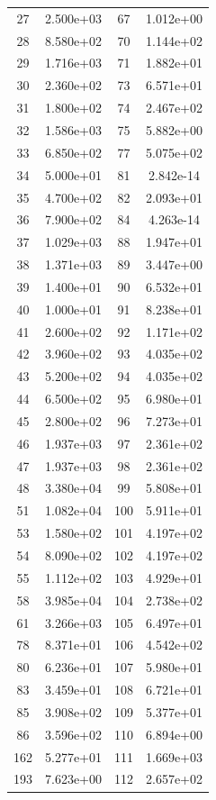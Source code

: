 \documentclass[12pt]{article}
\begin{document}
\begin{longtable}{@{}cccc@{}}
27 & 2.500e+03 & 67 & 1.012e+00 \\
28 & 8.580e+02 & 70 & 1.144e+02 \\
29 & 1.716e+03 & 71 & 1.882e+01 \\
30 & 2.360e+02 & 73 & 6.571e+01 \\
31 & 1.800e+02 & 74 & 2.467e+02 \\
32 & 1.586e+03 & 75 & 5.882e+00 \\
33 & 6.850e+02 & 77 & 5.075e+02 \\
34 & 5.000e+01 & 81 & 2.842e-14 \\
35 & 4.700e+02 & 82 & 2.093e+01 \\
36 & 7.900e+02 & 84 & 4.263e-14 \\
37 & 1.029e+03 & 88 & 1.947e+01 \\
38 & 1.371e+03 & 89 & 3.447e+00 \\
39 & 1.400e+01 & 90 & 6.532e+01 \\
40 & 1.000e+01 & 91 & 8.238e+01 \\
41 & 2.600e+02 & 92 & 1.171e+02 \\
42 & 3.960e+02 & 93 & 4.035e+02 \\
43 & 5.200e+02 & 94 & 4.035e+02 \\
44 & 6.500e+02 & 95 & 6.980e+01 \\
45 & 2.800e+02 & 96 & 7.273e+01 \\
46 & 1.937e+03 & 97 & 2.361e+02 \\
47 & 1.937e+03 & 98 & 2.361e+02 \\
48 & 3.380e+04 & 99 & 5.808e+01 \\
51 & 1.082e+04 & 100 & 5.911e+01 \\
53 & 1.580e+02 & 101 & 4.197e+02 \\
54 & 8.090e+02 & 102 & 4.197e+02 \\
55 & 1.112e+02 & 103 & 4.929e+01 \\
58 & 3.985e+04 & 104 & 2.738e+02 \\
61 & 3.266e+03 & 105 & 6.497e+01 \\
78 & 8.371e+01 & 106 & 4.542e+02 \\
80 & 6.236e+01 & 107 & 5.980e+01 \\
83 & 3.459e+01 & 108 & 6.721e+01 \\
85 & 3.908e+02 & 109 & 5.377e+01 \\
86 & 3.596e+02 & 110 & 6.894e+00 \\
162 & 5.277e+01 & 111 & 1.669e+03 \\
193 & 7.623e+00 & 112 & 2.657e+02 \\

\end{longtable}
\end{document}
